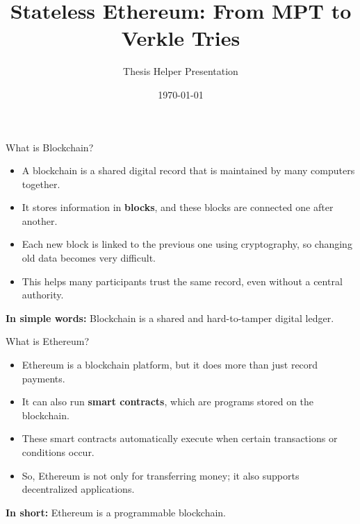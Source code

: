 \documentclass{beamer}
\title{Stateless Ethereum: From MPT to Verkle Tries}
\subtitle{Thesis Helper Presentation}
\date{\today}
\begin{document}
\maketitle

\begin{frame}{What is Blockchain?}
\begin{itemize}
    \item A blockchain is a shared digital record that is maintained by many computers together.
    \item It stores information in \textbf{blocks}, and these blocks are connected one after another.
    \item Each new block is linked to the previous one using cryptography, so changing old data becomes very difficult.
    \item This helps many participants trust the same record, even without a central authority.
\end{itemize}

\vspace{0.3cm}
\textbf{In simple words:} Blockchain is a shared and hard-to-tamper digital ledger.
\end{frame}

\begin{frame}{What is Ethereum?}
\begin{itemize}
    \item Ethereum is a blockchain platform, but it does more than just record payments.
    \item It can also run \textbf{smart contracts}, which are programs stored on the blockchain.
    \item These smart contracts automatically execute when certain transactions or conditions occur.
    \item So, Ethereum is not only for transferring money; it also supports decentralized applications.
\end{itemize}

\vspace{0.3cm}
\textbf{In short:} Ethereum is a programmable blockchain.
\end{frame}
\end{document}
